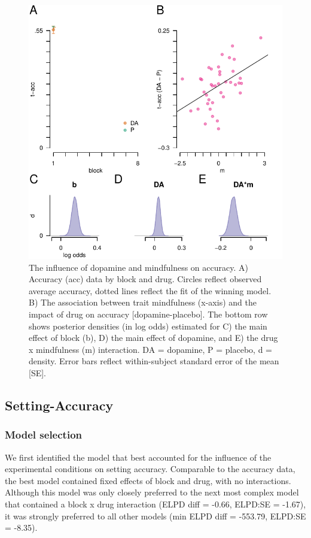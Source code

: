 \documentclass{article}
\begin{document}
\begin{figure}

{\centering \includegraphics[width=0.7\linewidth]{../../images/acc_fig} 

}

\caption{The influence of dopamine and mindfulness on accuracy. A) Accuracy (acc) data by block and drug. Circles reflect observed average accuracy, dotted lines reflect the fit of the winning model. B) The association between trait mindfulness (x-axis) and the impact of drug on accuracy [dopamine-placebo]. The bottom row shows posterior densities (in log odds) estimated for C) the main effect of block (b), D) the main effect of dopamine, and E) the drug x mindfulness (m) interaction. DA = dopamine, P = placebo, d = density. Error bars reflect within-subject standard error of the mean [SE].}\label{fig:accfig}
\end{figure}

\hypertarget{setting-accuracy-1}{%
\subsection{Setting-Accuracy}\label{setting-accuracy-1}}

\hypertarget{model-selection-1}{%
\subsubsection{Model selection}\label{model-selection-1}}

We first identified the model that best accounted for the influence of
the experimental conditions on setting accuracy. Comparable to the
accuracy data, the best model contained fixed effects of block and drug,
with no interactions. Although this model was only closely preferred to
the next most complex model that contained a block x drug interaction
(ELPD diff = -0.66, ELPD:SE = -1.67), it was strongly preferred to all
other models (min ELPD diff = -553.79, ELPD:SE = -8.35).
\end{document}
